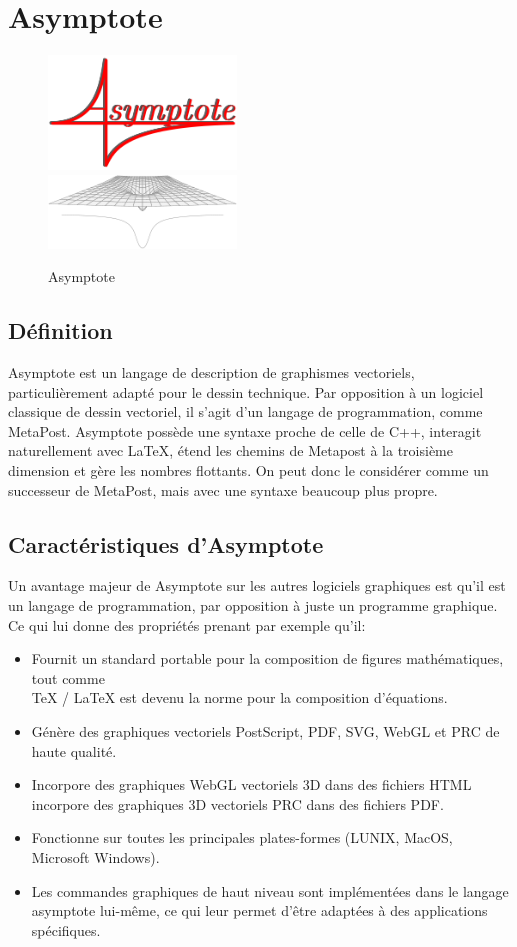 \documentclass[a4paper]{report}
\begin{document}
\section{Asymptote}
    \begin{figure}[!h] \centering
        \includegraphics[width=5cm]{images/asylogo.png}\\
        \includegraphics[width=5cm]{images/asyfonction.png}
        \caption{Asymptote} \label{Asymptote} 
    \end{figure}
\subsection{Définition}
Asymptote est un langage de description de graphismes vectoriels, particulièrement adapté pour le dessin technique. Par opposition à un logiciel classique de dessin vectoriel, il s'agit d'un langage de programmation, comme MetaPost. Asymptote possède une syntaxe proche de celle de C++, interagit naturellement avec LaTeX, étend les chemins de Metapost à la troisième dimension et gère les nombres flottants. On peut donc le considérer comme un successeur de MetaPost, mais avec une syntaxe beaucoup plus propre.
\subsection{Caractéristiques d'Asymptote}
Un avantage majeur de Asymptote sur les autres logiciels graphiques est qu'il est un langage de programmation, par opposition à juste un programme graphique. Ce qui lui donne des propriétés prenant par exemple qu'il: 
\begin{itemize}
\item Fournit un standard portable pour la composition de figures mathématiques, tout comme\\  TeX / LaTeX est devenu la norme pour la composition d'équations.
\item Génère des graphiques vectoriels PostScript, PDF, SVG, WebGL et PRC de haute qualité.
\item Incorpore des graphiques WebGL vectoriels 3D dans des fichiers HTML incorpore des graphiques   3D vectoriels PRC dans des fichiers PDF.
\item Fonctionne sur toutes les principales plates-formes (LUNIX, MacOS, Microsoft Windows).
\item Les commandes graphiques de haut niveau sont implémentées dans le langage asymptote lui-même, ce qui leur permet d'être adaptées à des applications spécifiques.
\end{itemize}
\newpage
\end{document}
